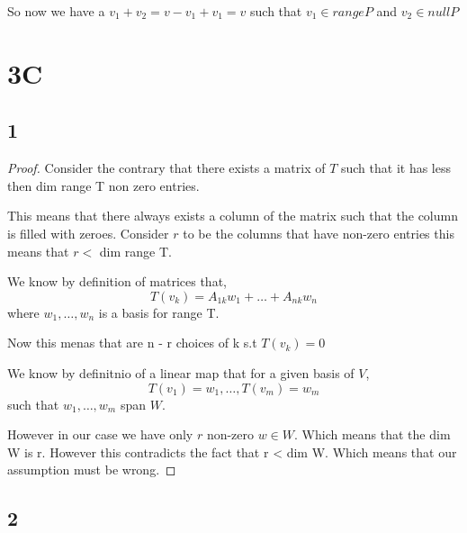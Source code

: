 \documentclass[a4paper]{report}
\begin{document}
So now we have a $v_1 + v_2 = v - v_1 + v_1 = v$  such that $v_1 \in range P$ and $v_2 \in null P$


\section*{3C}
\subsection*{1}

\begin{proof}
Consider the contrary that there exists a matrix of $T$ such that it has less then dim range T non zero entries.

This means that there always exists a column of the matrix such that the column is filled with zeroes. Consider $r$ to be the columns that have non-zero entries this means that $r < $ dim range T. 

We know by definition of matrices that,  
$$ T(v_k) = A_{1k}w_1 + \dots + A_{nk}w_n $$  where $w_1,\dots,w_n$ is a basis for range T.

Now this menas that are n - r choices of k s.t $T(v_k) = 0$ 


We know by definitnio of a linear map that for a given basis of $V $, 
$$ T(v_1) = w_1,\dots,T(v_m) = w_m $$ such that $w_1,\dots,w_m$ span $W$.

However in our case we have only  $r$ non-zero $w \in W$. Which means that the dim W is r. However this contradicts the fact that r < dim W. Which means that our assumption must be wrong.



\end{proof}


\subsection*{2}
\end{document}

